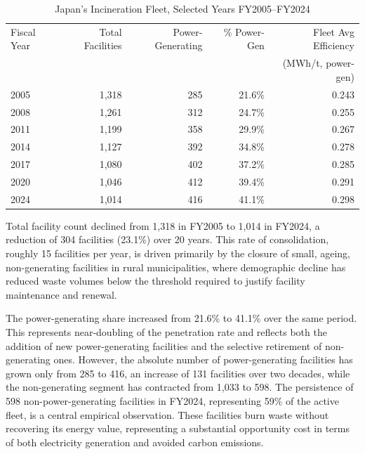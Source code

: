 \documentclass[12pt,a4paper]{article}
\begin{document}
\begin{table}[H]
  \centering
  \caption{Japan's Incineration Fleet, Selected Years FY2005--FY2024}
  \label{tab:fleet_evolution}
  \begin{tabular*}{\textwidth}{@{\extracolsep{\fill}}lrrrr@{}}
    \toprule
    Fiscal Year & Total Facilities & Power-Generating & \% Power-Gen & Fleet Avg Efficiency \\
                &                  &                  &              & (MWh/t, power-gen)   \\
    \midrule
    2005 & 1{,}318 & 285 & 21.6\% & 0.243 \\
    2008 & 1{,}261 & 312 & 24.7\% & 0.255 \\
    2011 & 1{,}199 & 358 & 29.9\% & 0.267 \\
    2014 & 1{,}127 & 392 & 34.8\% & 0.278 \\
    2017 & 1{,}080 & 402 & 37.2\% & 0.285 \\
    2020 & 1{,}046 & 412 & 39.4\% & 0.291 \\
    2024 & 1{,}014 & 416 & 41.1\% & 0.298 \\
    \bottomrule
  \end{tabular*}
\end{table}

Total facility count declined from 1,318 in FY2005 to 1,014 in FY2024, a reduction of 304 facilities (23.1\%) over 20 years. This rate of consolidation, roughly 15 facilities per year, is driven primarily by the closure of small, ageing, non-generating facilities in rural municipalities, where demographic decline has reduced waste volumes below the threshold required to justify facility maintenance and renewal.

The power-generating share increased from 21.6\% to 41.1\% over the same period. This represents near-doubling of the penetration rate and reflects both the addition of new power-generating facilities and the selective retirement of non-generating ones. However, the absolute number of power-generating facilities has grown only from 285 to 416, an increase of 131 facilities over two decades, while the non-generating segment has contracted from 1,033 to 598. The persistence of 598 non-power-generating facilities in FY2024, representing 59\% of the active fleet, is a central empirical observation. These facilities burn waste without recovering its energy value, representing a substantial opportunity cost in terms of both electricity generation and avoided carbon emissions.
\end{document}
